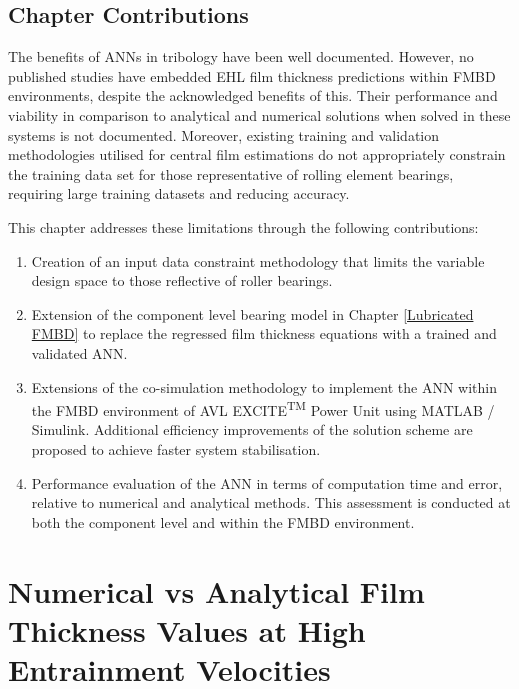 \subsection{Chapter Contributions}

The benefits of ANNs in tribology have been well documented. However, no published studies have embedded EHL film thickness predictions within FMBD environments, despite the acknowledged benefits of this. Their performance and viability in comparison to analytical and numerical solutions when solved in these systems is not documented. Moreover, existing training and validation methodologies utilised for central film estimations do not appropriately constrain the training data set for those representative of rolling element bearings, requiring large training datasets and reducing accuracy.

This chapter addresses these limitations through the following contributions:
\begin{enumerate}
	\item Creation of an input data constraint methodology that limits the variable design space to those reflective of roller bearings.
	\item Extension of the component level bearing model in Chapter \ref{Lubricated FMBD} to replace the regressed film thickness equations with a trained and validated ANN.
	\item Extensions of the co-simulation methodology to implement the ANN within the FMBD environment of AVL EXCITE\textsuperscript{TM} Power Unit using MATLAB\textregistered{} / Simulink\textregistered{}. Additional efficiency improvements of the solution scheme are proposed to achieve faster system stabilisation.
	\item Performance evaluation of the ANN in terms of computation time and error, relative to numerical and analytical methods. This assessment is conducted at both the component level and within the FMBD environment.
\end{enumerate}

\section{Numerical vs Analytical Film Thickness Values at High Entrainment Velocities} 
\label{Numerical vs Analytical Film Thickness Estimations at High Entrainment Velocities}

